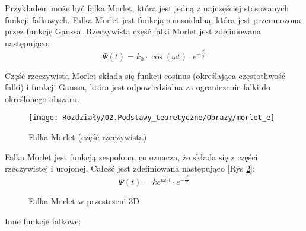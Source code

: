 Przykładem może być falka Morlet, która jest jedną z najczęściej stosowanych funkcji falkowych. Falka Morlet jest funkcją sinusoidalną, która jest przemnożona przez funkcję Gaussa. Rzeczywista część falki Morlet jest zdefiniowana następująco:
\begin{equation}
    \Psi(t)=k_0 \cdot \cos (\omega t) \cdot e^{-\frac{t^2}{2}}
\end{equation}

Część rzeczywista Morlet składa się funkcji cosinus (określająca częstotliwość falki) i funkcji Gaussa, która jest odpowiedzialna za ograniczenie falki do określonego obszaru.

\begin{figure}[ht]
    \centering
    \begin{minipage}[t]{0.7\linewidth}
        \texttt{[image: Rozdziały/02.Podstawy\_teoretyczne/Obrazy/morlet\_e]}
        \caption{Falka Morlet (część rzeczywista)}
        \label{fig:image29}
    \end{minipage}
\end{figure}

Falka Morlet jest funkcją zespoloną, co oznacza, że składa się z części rzeczywistej i urojonej. Całość jest zdefiniowana następująco [Rys \ref{fig:image30}]:
\begin{equation}
    \Psi(t)=k e^{i \omega_0 t} \cdot e^{-\frac{t^2}{2}}
\end{equation}

\begin{figure}[H]
    \centering
    \caption{Falka Morlet w przestrzeni 3D}
    \label{fig:image30}
\end{figure}

\newpage
Inne funkcje falkowe:

